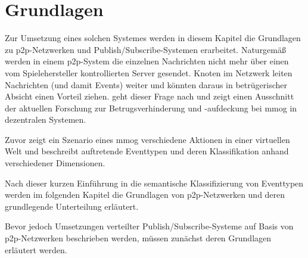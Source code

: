 \chapter{Grundlagen}
\label{chap:grundlagen}

Zur Umsetzung eines solchen Systemes werden in diesem Kapitel die Grundlagen zu \ac{p2p}-Netzwerken und Publish/Subscribe-Systemen erarbeitet. Naturgemäß werden in einem \ac{p2p}-System die einzelnen Nachrichten nicht mehr über einen vom Spielehersteller kontrollierten Server gesendet. Knoten im Netzwerk leiten Nachrichten (und damit Events) weiter und könnten daraus in betrügerischer Absicht einen Vorteil ziehen.  geht dieser Frage nach und zeigt einen Ausschnitt der aktuellen Forschung zur Betrugsverhinderung und -aufdeckung bei \ac{mmog} in dezentralen Systemen.

Zuvor zeigt ein Szenario eines \ac{mmog} verschiedene Aktionen in einer virtuellen Welt und beschreibt auftretende Eventtypen und deren Klassifikation anhand verschiedener Dimensionen.



Nach dieser kurzen Einführung in die semantische Klassifizierung von Eventtypen werden im folgenden Kapitel die Grundlagen von \ac{p2p}-Netzwerken und deren grundlegende Unterteilung erläutert.







Bevor jedoch Umsetzungen verteilter Publish/Subscribe-Systeme auf Basis von \ac{p2p}-Netzwerken beschrieben werden, müssen zunächst deren Grundlagen erläutert werden.


